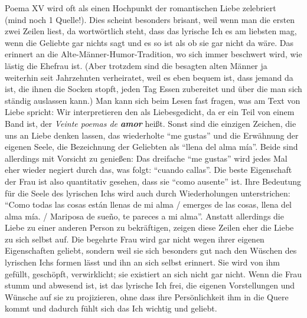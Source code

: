 Poema XV wird oft als einen Hochpunkt der romantischen Liebe zelebriert~\cite{Lagos1975} (mind noch 1 Quelle!).
Dies scheint besonders brisant, weil wenn man die ersten zwei Zeilen liest, da wortwörtlich steht, dass das lyrische Ich es am liebsten mag, wenn die Geliebte gar nichts sagt und es so ist als ob sie gar nicht da wäre.
Das erinnert an die Alte-Männer-Humor-Tradition, wo sich immer beschwert wird, wie lästig die Ehefrau ist.
(Aber trotzdem sind die besagten alten Männer ja weiterhin seit Jahrzehnten verheiratet, weil es eben bequem ist, dass jemand da ist, die ihnen die Socken stopft, jeden Tag Essen zubereitet und über die man sich ständig auslassen kann.)
Man kann sich beim Lesen fast fragen, was am Text von Liebe spricht:
Wir interpretieren den als Liebesgedicht, da er ein Teil von einem Band ist, der \textit{Veinte poemas de \textbf{amor}} heißt.
Sonst sind die einzigen Zeichen, die uns an Liebe denken lassen, das wiederholte ``me gustas'' und die Erwähnung der eigenen Seele, die Bezeichnung der Geliebten als ``llena del alma mía''.
Beide sind allerdings mit Vorsicht zu genießen:
Das dreifache ``me gustas'' wird jedes Mal eher wieder negiert durch das, was folgt: ``cuando callas''.
Die beste Eigenschaft der Frau ist also quantitativ gesehen, dass sie ``como ausente'' ist.
Ihre Bedeutung für die Seele des lyrischen Ichs wird auch durch Wiederholungen unterstrichen: ``Como todas las cosas están llenas de mi alma / emerges de las cosas, llena del alma mía. / Mariposa de sueño, te pareces a mi alma''.
Anstatt allerdings die Liebe zu einer anderen Person zu bekräftigen, zeigen diese Zeilen eher die Liebe zu sich selbst auf.
Die begehrte Frau wird gar nicht wegen ihrer eigenen Eigenschaften geliebt, sondern weil sie sich besonders gut nach den Wüschen des lyrischen Ichs formen lässt und ihn an sich selbst erinnert.
Sie wird von ihm gefüllt, geschöpft, verwirklicht; sie existiert an sich nicht gar nicht.
Wenn die Frau stumm und abwesend ist, ist das lyrische Ich frei, die eigenen Vorstellungen und Wünsche auf sie zu projizieren, ohne dass ihre Persönlichkeit ihm in die Quere kommt und dadurch fühlt sich das Ich wichtig und geliebt.

